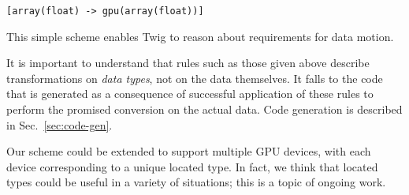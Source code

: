 \begin{verbatim}
[array(float) -> gpu(array(float))]
\end{verbatim}

This simple scheme enables Twig to reason about requirements for data motion.

It is important to understand that rules such as those given above describe transformations on \emph{data types}, not on the data themselves. It falls to the code that is generated as a consequence of successful application of these rules to perform the promised conversion on the actual data. Code generation is described in Sec.~\ref{sec:code-gen}.

Our scheme could be extended to support multiple GPU devices, with each device corresponding to a unique located type. In fact, we think that located types could be useful in a variety of situations; this is a topic of ongoing work.

% 
% 
